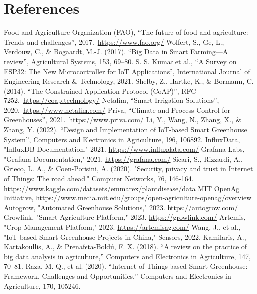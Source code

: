 \documentclass[12pt,a4paper]{article}
\begin{document}
\section{References}
\begin{thebibliography}{99}
 Food and Agriculture Organization (FAO), ``The future of food and agriculture: Trends and challenges'', 2017.\ \url{https://www.fao.org/}
 Wolfert, S., Ge, L., Verdouw, C., \& Bogaardt, M.-J. (2017). ``Big Data in Smart Farming---A review'', Agricultural Systems, 153, 69--80.
 S. S. Kumar et al., ``A Survey on ESP32: The New Microcontroller for IoT Applications'', International Journal of Engineering Research \& Technology, 2021.
 Shelby, Z., Hartke, K., \& Bormann, C. (2014). ``The Constrained Application Protocol (CoAP)'', RFC 7252.\ \url{https://coap.technology/}
 Netafim, ``Smart Irrigation Solutions'', 2020.\ \url{https://www.netafim.com/}
 Priva, ``Climate and Process Control for Greenhouses'', 2021.\ \url{https://www.priva.com/}
 Li, Y., Wang, N., Zhang, X., \& Zhang, Y. (2022). ``Design and Implementation of IoT-based Smart Greenhouse System'', Computers and Electronics in Agriculture, 196, 106892.
 InfluxData, "InfluxDB Documentation," 2021. \url{https://www.influxdata.com/}
 Grafana Labs, "Grafana Documentation," 2021. \url{https://grafana.com/}
 Sicari, S., Rizzardi, A., Grieco, L. A., \& Coen-Porisini, A. (2020). "Security, privacy and trust in Internet of Things: The road ahead," Computer Networks, 76, 146-164.
 \url{https://www.kaggle.com/datasets/emmarex/plantdisease/data}
 MIT OpenAg Initiative, \url{https://www.media.mit.edu/groups/open-agriculture-openag/overview}
 Autogrow, "Automated Greenhouse Solutions," 2023. \url{https://autogrow.com/}
 Growlink, "Smart Agriculture Platform," 2023. \url{https://growlink.com/}
 Artemis, "Crop Management Platform," 2023. \url{https://artemisag.com/}
 Wang, J., et al., "IoT-based Smart Greenhouse Projects in China," Sensors, 2022.
 Kamilaris, A., Kartakoullis, A., \& Prenafeta-Boldú, F. X. (2018). ``A review on the practice of big data analysis in agriculture,'' Computers and Electronics in Agriculture, 147, 70--81.
 Raza, M. Q., et al. (2020). ``Internet of Things-based Smart Greenhouse: Framework, Challenges and Opportunities,'' Computers and Electronics in Agriculture, 170, 105246.

\end{thebibliography}
\end{document}

